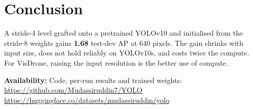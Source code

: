 \documentclass[runningheads]{llncs}
\begin{document}
\section{Conclusion}
A stride-4 level grafted onto a pretrained YOLOv10 and initialised from the stride-8 weights gains \textbf{1.68} test-dev AP at 640 pixels. The gain shrinks with input size, does not hold reliably on YOLOv10s, and costs twice the compute. For VisDrone, raising the input resolution is the better use of compute.

\textbf{Availability:} Code, per-run results and trained weights:\\ \url{https://github.com/Mudassiruddin7/YOLO}\\ \url{https://huggingface.co/datasets/mudassiruddin/yolo}



\end{document}

